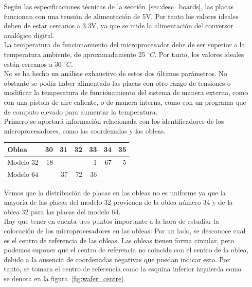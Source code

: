 \documentclass[spanish]{template/minim}
\begin{document}
Según las especificaciones técnicas de la sección~\ref{sec:desc_boards}, las placas funcionan con una tensión de alimentación de 5V. Por tanto los valores ideales deben de estar cercanos a 3.3V, ya que se mide la alimentación del conversor analógico digital.\\

La temperatura de funcionamiento del microprocesador debe de ser superior a la temperatura ambiente, de aproximadamente 25 $^\circ C$. Por tanto, los valores ideales están cercanos a 30 $^\circ C$.\\

No se ha hecho un análisis exhaustivo de estos dos últimos parámetros. No obstante se podía haber alimentado las placas con otro rango de tensiones o modificar la temperatura de funcionamiento del sistema de manera externa, como con una pistola de aire caliente, o de manera interna, como con un programa que de computo elevado para aumentar la temperatura.\\

Primero se aportará información relacionada con los identificadores de los microprocesadores, como las coordenadas y las obleas.\\

\begin{table}[H]
    \centering


    \begin{tabularx}{\linewidth}{Xrrrrrr}
      \toprule
      Oblea & 30 & 31 & 32 & 33 & 34 & 35 \\
      \midrule
      Modelo 32    & 18 &    &    &  1 & 67 &  5 \\
      Modelo 64    &    & 37 & 72 & 36 &    &    \\
      \bottomrule
    \end{tabularx}

\end{table}

Vemos que la distribución de placas en las obleas no es uniforme ya que la mayoría de las placas del modelo 32 provienen de la oblea número {\color{Red}34} y de la oblea {\color{Red}32} para las placas del modelo 64.\\

Hay que tener en cuenta tres puntos importante a la hora de estudiar la colocación de los microprocesadores en las obleas: Por un lado, se desconoce cual es el centro de referencia de las obleas. Las obleas tienen forma circular, pero podemos suponer que el centro de referencia no coincide con el centro de la oblea, debido a la ausencia de coordenadas negativas que puedan indicar esto. Por tanto, se tomara el centro de referencia como la esquina inferior izquierda como se denota en la figura~\ref{fig:wafer_centre}.\\
\end{document}
